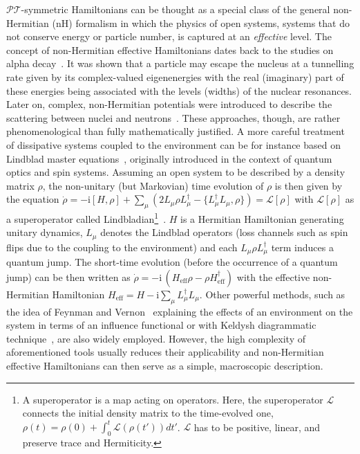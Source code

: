 $\mathcal{PT}$-symmetric Hamiltonians can be thought as a special class of the general non-Hermitian (nH) formalism in which the physics of open systems, \ie systems that do not conserve energy or particle number, is captured at an \emph{effective} level. The concept of non-Hermitian effective Hamiltonians dates back to the studies on alpha decay~\cite{Gamow1928}. It was shown that a particle may escape the nucleus at a tunnelling rate given by its complex-valued eigenenergies with the real (imaginary) part of these energies being associated with the levels (widths) of the nuclear resonances. Later on, complex, non-Hermitian potentials were introduced to describe the scattering between nuclei and neutrons~\cite{PhysRev.96.448}. These approaches, though, are rather phenomenological than fully mathematically justified. A more careful treatment of dissipative systems coupled to the environment can be for instance based on Lindblad master equations~\cite{Lindblad1976}, originally introduced in the context of quantum optics and spin systems. Assuming an open system to be described by a density matrix $\rho$, the non-unitary (but Markovian) time evolution of $\rho$ is then given by the equation $\dot{\rho} = - \mathrm{i} [H, \rho] + \sum_{\mu} (2 L_{\mu} \rho L_{\mu}^{\dagger} - \lbrace L_{\mu}^{\dagger} L_{\mu}, \rho \rbrace  ) = \mathcal{L} [\rho]$ with $ \mathcal{L} [\rho]$ as a superoperator called Lindbladian\footnote{A superoperator is a map acting on operators. Here, the superoperator $\mathcal{L}$ connects the initial density matrix to the time-evolved one, $\rho(t) = \rho (0) +  \int_0^t \mathcal{L} (\rho(t')) dt'$. $\mathcal{L}$ has to be positive, linear, and preserve trace and Hermiticity.}~\cite{breuer2002theory}. $H$ is a Hermitian Hamiltonian generating unitary dynamics, $L_{\mu}$ denotes the Lindblad operators (loss channels such as spin flips due to the coupling to the environment) and each $ L_{\mu} \rho L_{\mu}^{\dagger}$ term induces a quantum jump. The short-time evolution (before the occurrence of a quantum jump) can be then written as $\dot{\rho} = - \mathrm{i} \, (H_{\mathrm{eff}} \rho - \rho H_{\mathrm{eff}}^{\dagger})$ with the effective non-Hermitian Hamiltonian $H_{\mathrm{eff}} = H - \mathrm{i} \sum_{\mu} L_{\mu}^{\dagger}   L_{\mu}$. Other powerful methods, such as the idea of Feynman and Vernon~\cite{FEYNMAN2000547} explaining the effects of an environment on the system in terms of an influence functional or with Keldysh diagrammatic technique~\cite{keldysh1965diagram}, are also widely employed. However, the high complexity of aforementioned tools usually reduces their applicability and non-Hermitian effective Hamiltonians can then serve as a simple, macroscopic description.

